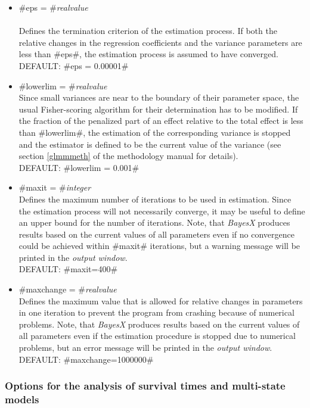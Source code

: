 \begin{itemize}
\item #eps = #{\em realvalue } \\
\\Defines the termination criterion of the estimation process. If
both the relative changes in the regression coefficients and the
variance parameters are less than #eps#, the estimation process is
assumed to have converged.\\
DEFAULT: #eps = 0.00001#

\item #lowerlim = #{\em realvalue } \\
Since small variances are near to the boundary of their parameter
space, the usual Fisher-scoring algorithm for their determination
has to be modified. If the fraction of the penalized part of an
effect relative to the total effect is less than #lowerlim#, the
estimation of the corresponding variance is stopped and the
estimator is defined to be the current value of the variance (see
section \ref*{glmmmeth} of the methodology manual for details).\\
DEFAULT: #lowerlim = 0.001#

\item #maxit = #{\em integer } \\
Defines the maximum number of iterations to be used in estimation.
Since the estimation process will not necessarily converge, it may
be useful to define an upper bound for the number of iterations.
Note, that {\it BayesX} produces results based on the current
values of all parameters even if no convergence could be achieved
within #maxit# iterations, but a warning message will be printed
in the {\it output window}.\\
DEFAULT: #maxit=400#

\item #maxchange = #{\em realvalue } \\
Defines the maximum value that is allowed for relative changes in
parameters in one iteration to prevent the program from crashing
because of numerical problems. Note, that {\it BayesX} produces
results based on the current values of all parameters even if the
estimation procedure is stopped due to numerical problems, but an
error message will be printed in the {\it output window}.\\
DEFAULT: #maxchange=1000000#
\end{itemize}

\subsubsection*{Options for the analysis of survival times and multi-state models}
\label{remlest_survival_options}

